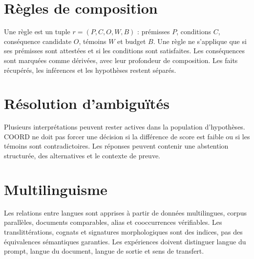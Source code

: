 \documentclass[11pt,a4paper,oneside]{report}
\begin{document}
\section{Règles de composition}
Une règle est un tuple $r=(P,C,O,W,B)$ : prémisses $P$, conditions $C$, conséquence candidate $O$, témoins $W$ et budget $B$. Une règle ne s'applique que si ses prémisses sont attestées et si les conditions sont satisfaites. Les conséquences sont marquées comme dérivées, avec leur profondeur de composition. Les faits récupérés, les inférences et les hypothèses restent séparés.

\section{Résolution d'ambiguïtés}
Plusieurs interprétations peuvent rester actives dans la population d'hypothèses. COORD ne doit pas forcer une décision si la différence de score est faible ou si les témoins sont contradictoires. Les réponses peuvent contenir une abstention structurée, des alternatives et le contexte de preuve.

\section{Multilinguisme}
Les relations entre langues sont apprises à partir de données multilingues, corpus parallèles, documents comparables, alias et cooccurrences vérifiables. Les translittérations, cognats et signatures morphologiques sont des indices, pas des équivalences sémantiques garanties. Les expériences doivent distinguer langue du prompt, langue du document, langue de sortie et sens de transfert.
\end{document}
